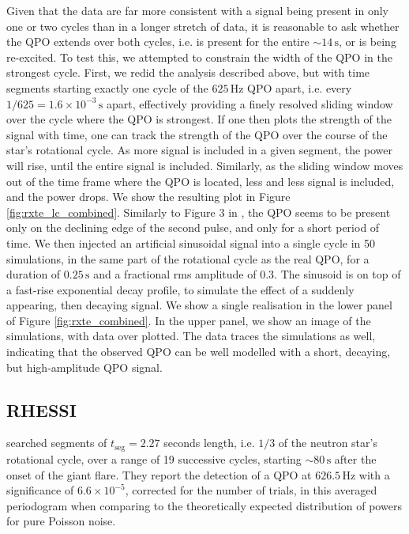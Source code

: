 \documentclass{emulateapj}
\begin{document}
Given that the data are far more consistent with a signal being present in only one or two cycles than in a longer stretch of data, it is reasonable to ask whether the QPO extends over both cycles, i.e. is present for the entire $\sim 14\, \mathrm{s}$, or is being re-excited. To test this, we attempted to constrain the width of the QPO in the strongest cycle. First, we redid the analysis described above, but with time segments starting exactly one cycle of the $625 \, \mathrm{Hz}$ QPO apart, i.e. every $1/625 = 1.6 \times 10^{-3} \, \mathrm{s}$ apart, effectively providing a finely resolved sliding window over the cycle where the QPO is strongest. If one then plots the strength of the signal with time, one can track the strength of the QPO over the course of the star's rotational cycle. As more signal is included in a given segment, the power will rise, until the entire signal is included. Similarly, as the sliding window moves out of the time frame where the QPO is located, less and less signal is included, and the power drops. We show the resulting plot in Figure \ref{fig:rxte_lc_combined}. Similarly to Figure 3 in \citet{Strohmayer06}, the QPO seems to be present only on the declining edge of the second pulse, and only for a short period of time. We then injected an artificial sinusoidal signal into a single cycle in 50 simulations, in the same part of the rotational cycle as the real QPO, for a duration of $0.25\, \mathrm{s}$ and a fractional rms amplitude of $0.3$. The sinusoid is on top of a fast-rise exponential decay profile, to simulate the effect of a suddenly appearing, then decaying signal. We show a single realisation in the lower panel of Figure \ref{fig:rxte_combined}. In the upper panel, we show an image of the simulations, with data over plotted. The data traces the simulations as well, indicating that the observed QPO can be well modelled with a short, decaying, but high-amplitude QPO signal. 


\subsection{RHESSI}
\label{sec:rhessi_results}

\citealt{Watts06} searched segments of $t_{\mathrm{seg}} = 2.27$ seconds length, i.e. $1/3$ of the neutron star's rotational cycle, over a range of 19 successive cycles, starting $\sim 80 \, \mathrm{s}$ after the onset of the giant flare. They report the detection of a QPO at $626.5 \, \mathrm{Hz}$ with a significance of $6.6 \times 10^{-5}$, corrected for the number of trials, in this averaged periodogram when comparing to the theoretically expected distribution of powers for pure Poisson noise.
\end{document}
